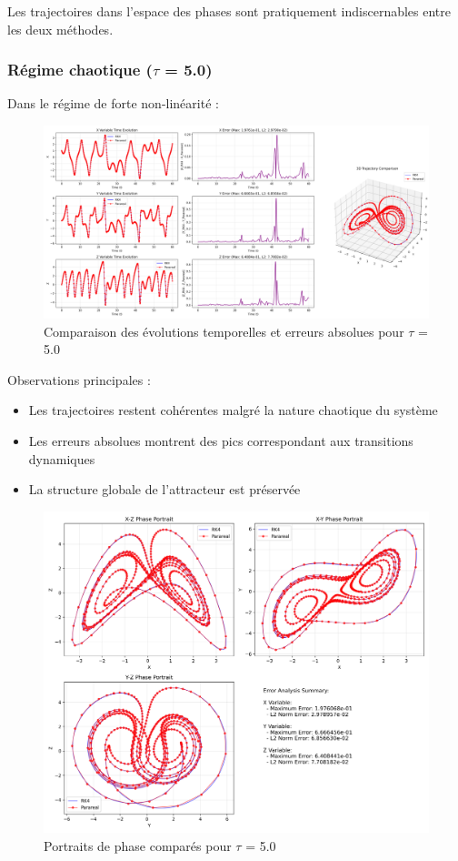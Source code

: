 Les trajectoires dans l'espace des phases sont pratiquement indiscernables entre les deux méthodes.

\subsubsection{Régime chaotique ($\tau$ = 5.0)}
Dans le régime de forte non-linéarité :

\begin{figure}[H]
    \centering
    \includegraphics[width=\textwidth]{figures/comparisons/comparison_tau5.0_comparison}
    \caption{Comparaison des évolutions temporelles et erreurs absolues pour $\tau$ = 5.0}
    \label{fig:comp_tau5.0_time}
\end{figure}

Observations principales :
\begin{itemize}
    \item Les trajectoires restent cohérentes malgré la nature chaotique du système
    \item Les erreurs absolues montrent des pics correspondant aux transitions dynamiques
    \item La structure globale de l'attracteur est préservée
\end{itemize}

\begin{figure}[H]
    \centering
    \includegraphics[width=\textwidth]{figures/comparisons/comparison_tau5.0_phase_portraits}
    \caption{Portraits de phase comparés pour $\tau$ = 5.0}
    \label{fig:comp_tau5.0_phase}
\end{figure}

